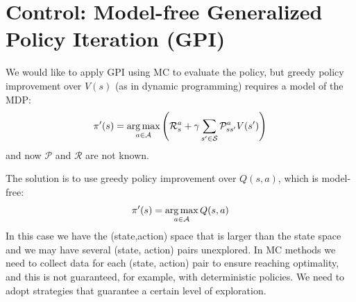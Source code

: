 \section{Control: Model-free Generalized Policy Iteration (GPI)}
We would like to apply GPI using MC to evaluate the policy, but greedy policy improvement over $V(s)$ (as in dynamic programming) requires a model of the MDP:
\[\pi'(s)=\operatorname*{arg\,max}_{a\in\mathcal{A}}\left(\mathcal{R}_s^a+\gamma\sum_{s'\in\mathcal{S}}\mathcal{P}_{ss'}^aV(s')\right)\]
and now $\mathcal{P}$ and $\mathcal{R}$ are not known.

The solution is to use greedy policy improvement over $Q(s,a)$, which is model-free:
\[\pi'(s)=\operatorname*{arg\,max}_{a\in\mathcal{A}}Q(s,a)\]
In this case we have the (state,action) space that is larger than the state space and we may have several (state, action) pairs unexplored. In MC methods we need to collect data for each (state, action) pair to ensure reaching optimality, and this is not guaranteed, for example, with deterministic policies. We need to adopt strategies that guarantee a certain level of exploration.

